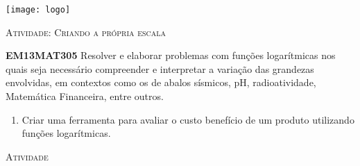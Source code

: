 \documentclass[10 pt,usenames,dvipsnames, oneside]{article}
\begin{document}
\begin{center}
  \begin{minipage}[l]{3cm}
\texttt{[image: logo]}    
\end{minipage}\hfill
\begin{minipage}[r]{.8\textwidth}
 {\Large \scshape Atividade: Criando a própria escala}  
\end{minipage}
\end{center}
\vspace{.2cm}

\ifdefined\prof
\begin{objetivos}
\item \textbf{EM13MAT305} Resolver e elaborar problemas com funções logarítmicas nos quais seja necessário compreender e interpretar a variação das grandezas envolvidas, em contextos como os de abalos sísmicos, pH, radioatividade, Matemática Financeira, entre outros.
\end{objetivos}

\begin{goals}
\begin{enumerate}
\item Criar uma ferramenta para avaliar o custo benefício de um produto utilizando funções logarítmicas.
\end{enumerate}

\end{goals}

\bigskip
\begin{center}
{\large \scshape Atividade}
\end{center}
\fi
\end{document}
